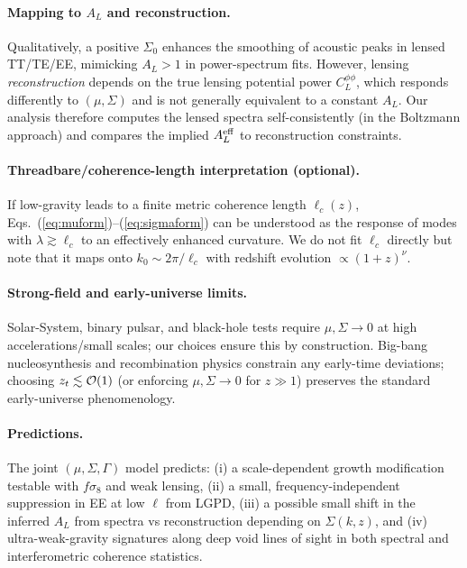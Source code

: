 \paragraph{Mapping to $A_L$ and reconstruction.}
Qualitatively, a positive $\Sigma_0$ enhances the smoothing of acoustic peaks in lensed TT/TE/EE, mimicking $A_L>1$ in power-spectrum fits. However, lensing \emph{reconstruction} depends on the true lensing potential power $C_L^{\phi\phi}$, which responds differently to $(\mu,\Sigma)$ and is not generally equivalent to a constant $A_L$. Our analysis therefore computes the lensed spectra self-consistently (in the Boltzmann approach) and compares the implied $A_L^{\rm eff}$ to reconstruction constraints.

\paragraph{Threadbare/coherence-length interpretation (optional).}
If low-gravity leads to a finite metric coherence length $\ell_c(z)$, Eqs.~(\ref{eq:muform})--(\ref{eq:sigmaform}) can be understood as the response of modes with $\lambda\gtrsim \ell_c$ to an effectively enhanced curvature. We do not fit $\ell_c$ directly but note that it maps onto $k_0\sim 2\pi/\ell_c$ with redshift evolution $\propto (1+z)^{\nu}$.

\paragraph{Strong-field and early-universe limits.}
Solar-System, binary pulsar, and black-hole tests require $\mu,\Sigma\to 0$ at high accelerations/small scales; our choices ensure this by construction. Big-bang nucleosynthesis and recombination physics constrain any early-time deviations; choosing $z_t\lesssim {\cal O}(1)$ (or enforcing $\mu,\Sigma\to 0$ for $z\gg 1$) preserves the standard early-universe phenomenology.

\paragraph{Predictions.}
The joint $(\mu,\Sigma,\Gamma)$ model predicts: (i) a scale-dependent growth modification testable with $f\sigma_8$ and weak lensing, (ii) a small, frequency-independent suppression in EE at low $\ell$ from LGPD, (iii) a possible small shift in the inferred $A_L$ from spectra vs reconstruction depending on $\Sigma(k,z)$, and (iv) ultra-weak-gravity signatures along deep void lines of sight in both spectral and interferometric coherence statistics.
